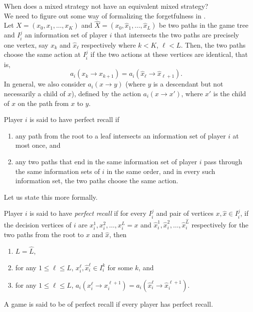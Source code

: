 	When does a mixed strategy not have an equivalent mixed strategy?\\
	We need to figure out some way of formalizing the forgetfulness in .\\
	Let $X = (x_0,x_1,\ldots,x_K)$ and $\hat{X} = (x_0,\hat{x}_1,\ldots,\hat{x}_L)$ be two paths in the game tree and $I_i^j$ an information set of player $i$ that intersects the two paths are precisely one vertex, say $x_k$ and $\hat{x}_\ell$ respectively where $k<K$, $\ell<L$. Then, the two paths choose the same action at $I_i^j$ if the two actions at these vertices are identical, that is,
	\[  a_i(x_k \to x_{k+1}) = a_i(\hat{x}_\ell \to \hat{x}_{\ell+1}). \]
	In general, we also consider $a_i(x \to y)$ (where $y$ is a descendant but not necessarily a child of $x$), defined by the action $a_i(x \to x')$, where $x'$ is the child of $x$ on the path from $x$ to $y$.

	Player $i$ is said to have perfect recall if
	\begin{enumerate}
		\item any path from the root to a leaf intersects an information set of player $i$ at most once, and
		\item any two paths that end in the same information set of player $i$ pass through the same information sets of $i$ in the same order, and in every such information set, the two paths choose the same action.
	\end{enumerate}

	Let us state this more formally.

	\begin{fdef}
		Player $i$ is said to have \emph{perfect recall} if for every $I_i^j$ and pair of vertices $x,\hat{x} \in I_i^j$, if the decision vertices of $i$ are $x_i^1,x_i^2,\ldots,x_i^L = x$ and $\hat{x}_i^1,\hat{x}_i^2,\ldots,\hat{x}_i^{\hat{L}}$ respectively for the two paths from the root to $x$ and $\hat{x}$, then
		\begin{enumerate}
			\item $L = \hat{L}$,
			\item for any $1 \le \ell \le L$, $x_i^\ell,\hat{x}_i^\ell \in I_i^k$ for some $k$, and
			\item for any $1 \le \ell \le L$, $a_i(x_i^\ell \to x_i^{\ell+1}) = a_i(\hat{x}_i^\ell \to \hat{x}_i^{\ell+1})$.
		\end{enumerate}
		A game is said to be of perfect recall if every player has perfect recall.
	\end{fdef}

